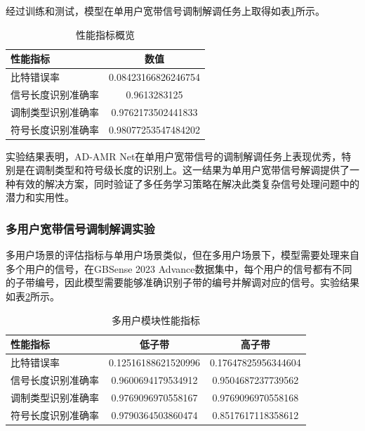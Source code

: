 经过训练和测试，模型在单用户宽带信号调制解调任务上取得如表\ref{tab:performance_metrics}所示。
\begin{table}[ht]
    \centering
    \caption{性能指标概览}
    \begin{tabular}{l|c}
        \hline
        \textbf{性能指标} & \textbf{数值} \\
        \hline
        比特错误率 & 0.08423166826246754 \\
        信号长度识别准确率 & 0.9613283125 \\
        调制类型识别准确率 & 0.9762173502441833 \\
        符号长度识别准确率 & 0.98077253547484202 \\
        \hline
    \end{tabular}
    \label{tab:performance_metrics}
\end{table}

    

实验结果表明，AD-AMR Net在单用户宽带信号的调制解调任务上表现优秀，特别是在调制类型和符号级长度的识别上。这一结果为单用户宽带信号解调提供了一种有效的解决方案，同时验证了多任务学习策略在解决此类复杂信号处理问题中的潜力和实用性。

\subsubsection{多用户宽带信号调制解调实验}

多用户场景的评估指标与单用户场景类似，但在多用户场景下，模型需要处理来自多个用户的信号，在GBSense 2023 Advance数据集中，每个用户的信号都有不同的子带编号，因此模型需要能够准确识别子带的编号并解调对应的信号。实验结果如表\ref{tab:multi_user_module_performance}所示。

\begin{table}[ht]
    \centering
    \caption{多用户模块性能指标}
    \begin{tabular}{l|c|c}
        \hline
        \textbf{性能指标} & \textbf{低子带} & \textbf{高子带} \\
        \hline
        比特错误率 & 0.12516188621520996 & 0.17647825956344604 \\
        信号长度识别准确率 & 0.9600694179534912 & 0.9504687237739562 \\
        调制类型识别准确率 & 0.9769096970558167 & 0.9769096970558168 \\
        符号长度识别准确率 & 0.9790364503860474 & 0.8517617118358612 \\
        \hline
    \end{tabular}
    \label{tab:multi_user_module_performance}
\end{table}

